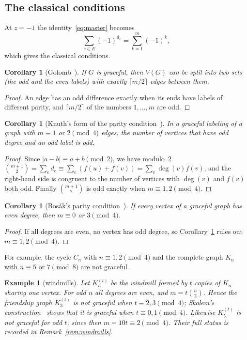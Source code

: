 \documentclass[11pt]{amsart}
\theoremstyle{tplain}
\newtheorem{corollary}[theorem]{Corollary}
\theoremstyle{tdefinition}
\newtheorem{example}[theorem]{Example}
\theoremstyle{tremark}
\begin{document}
\subsection{The classical conditions}

At $z=-1$ the identity~\eqref{eq:master} becomes
\[
  \sum_{e\in E}(-1)^{d_e}=\sum_{k=1}^m(-1)^k,
\]
which gives the classical conditions.

\begin{corollary}[Golomb~\cite{golomb}]\label{cor:golomb}
If $G$ is graceful, then $V(G)$ can be split into two sets (the odd and the
even labels) with exactly $\lceil m/2\rceil$ edges between them.
\end{corollary}

\begin{proof}
An edge has an odd difference exactly when its ends have labels of different
parity, and $\lceil m/2\rceil$ of the numbers $1,\dots,m$ are odd.
\end{proof}

\begin{corollary}[Knuth's form of the parity condition~\cite{knuth-pre}]\label{cor:knuthparity}
In a graceful labeling of a graph with $m\equiv1$ or $2\pmod4$ edges, the
number of vertices that have odd degree \emph{and} an odd label is odd.
\end{corollary}

\begin{proof}
Since $|a-b|\equiv a+b\pmod2$, we have modulo~$2$
$\binom{m+1}2=\sum_e d_e\equiv\sum_e(f(u)+f(v))=\sum_v\deg(v)f(v)$,
and the right-hand side is congruent to the number of vertices with
$\deg(v)$ and $f(v)$ both odd. Finally $\binom{m+1}2$ is odd exactly when
$m\equiv1,2\pmod4$.
\end{proof}

\begin{corollary}[Bos\'ak's parity condition~\cite{rosa65,rosa}]\label{cor:rosa}
If every vertex of a graceful graph has even degree, then $m\equiv0$ or
$3\pmod 4$.
\end{corollary}

\begin{proof}
If all degrees are even, no vertex has odd degree, so
Corollary~\ref{cor:knuthparity} rules out $m\equiv1,2\pmod4$.
\end{proof}

For example, the cycle $C_n$ with $n\equiv1,2\pmod4$ and the complete graph
$K_n$ with $n\equiv5$ or $7\pmod8$ are not graceful.

\begin{example}[windmills]\label{ex:windmills}
Let $K_n^{(t)}$ be the windmill formed by $t$ copies of $K_n$ sharing one
vertex. For odd $n$ all degrees are even, and $m=t\binom n2$. Hence the
friendship graph $K_3^{(t)}$ is not graceful when $t\equiv2,3\pmod4$; Skolem's
construction~\cite{skolem} shows that it is graceful when $t\equiv0,1\pmod 4$.
Likewise $K_5^{(t)}$ is not graceful for odd $t$, since then
$m=10t\equiv2\pmod4$. Their full status is recorded in
Remark~\ref{rem:windmills}.
\end{example}
\end{document}

